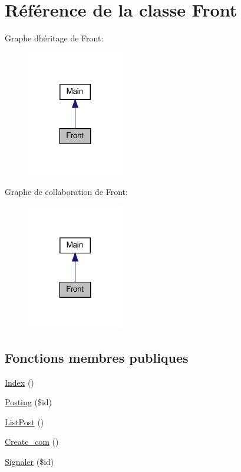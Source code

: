 \hypertarget{class_src_1_1_controllers_1_1_front}{}\section{Référence de la classe Front}
\label{class_src_1_1_controllers_1_1_front}


Graphe d\textquotesingle{}héritage de Front\+:\nopagebreak
\begin{figure}[H]
\begin{center}
\leavevmode
\includegraphics[width=119pt]{d6/db7/class_src_1_1_controllers_1_1_front__inherit__graph}
\end{center}
\end{figure}


Graphe de collaboration de Front\+:\nopagebreak
\begin{figure}[H]
\begin{center}
\leavevmode
\includegraphics[width=119pt]{d8/d00/class_src_1_1_controllers_1_1_front__coll__graph}
\end{center}
\end{figure}
\subsection*{Fonctions membres publiques}
\begin{DoxyCompactItemize}
\item 
\hyperlink{class_src_1_1_controllers_1_1_front_ac36db983080e1b0934908febca5de2d9}{Index} ()
\item 
\hyperlink{class_src_1_1_controllers_1_1_front_a5fcbe325afb03acc6e4eaec38a7bb1ae}{Posting} (\$id)
\item 
\hyperlink{class_src_1_1_controllers_1_1_front_a8ce0a92892ab19020f1ebefe99d88a00}{List\+Post} ()
\item 
\hyperlink{class_src_1_1_controllers_1_1_front_aff5b608669ee776cd4c341238adddb7c}{Create\+\_\+com} ()
\item 
\hyperlink{class_src_1_1_controllers_1_1_front_a8b22c40bd1737bbb7db0816b7e9763b3}{Signaler} (\$id)
\end{DoxyCompactItemize}
